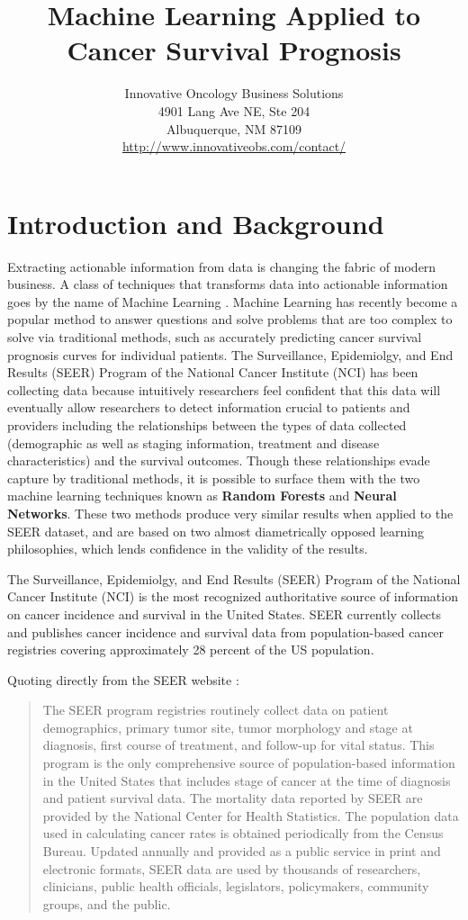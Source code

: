 \documentclass[a4paper,11pt]{article}
\title{Machine Learning Applied to Cancer Survival Prognosis}
\author{Innovative Oncology Business Solutions \\
 4901 Lang Ave NE, Ste 204 \\
Albuquerque, NM 87109 \\
\url{http://www.innovativeobs.com/contact/}}
\date{}
\begin{document}
\maketitle
\flushbottom


\section{Introduction and Background}
\label{sec:intro}



Extracting actionable information from data is changing the fabric of modern business. A class of techniques that transforms data into actionable information goes by the name of Machine Learning \cite{pythonmachinelearning}.
Machine Learning has recently become a popular method to answer questions and solve problems that are too complex to solve via traditional methods, such as  accurately predicting cancer survival prognosis curves for individual patients.
The Surveillance, Epidemiolgy, and End Results (SEER) Program of the National Cancer Institute (NCI) has been collecting data because intuitively researchers feel confident that this data will 
eventually allow researchers to detect information crucial to patients and providers including the 
relationships between the types of data collected (demographic as well as staging information, treatment and disease characteristics) and the survival outcomes.
Though these relationships evade capture by traditional methods, it is possible to surface them with the two machine learning techniques known as \textbf{Random Forests} and \textbf{Neural Networks}. These two methods produce very similar results when applied to the SEER dataset, and are based on two almost diametrically opposed learning philosophies, which lends confidence in the validity of the results.

The Surveillance, Epidemiolgy, and End Results (SEER) Program of the National Cancer Institute (NCI) is the most recognized authoritative source of information on cancer incidence and survival in the United States. SEER currently collects and publishes cancer incidence and survival data from population-based cancer registries covering approximately 28 percent of the US population.


Quoting directly from the SEER
website \citep{seerwebsite}:

\begin{quote}
The SEER program registries routinely collect data on patient demographics, primary tumor site, tumor morphology and stage at diagnosis, first course of treatment, and follow-up for vital status. This program is the only comprehensive source of population-based information in the United States that includes stage of cancer at the time of diagnosis and patient survival data. The mortality data reported by SEER are provided by the National Center for Health Statistics. The population data used in calculating cancer rates is obtained periodically from the Census Bureau. Updated annually and provided as a public service in print and electronic formats, SEER data are used by thousands of researchers, clinicians, public health officials, legislators, policymakers, community groups, and the public.
\end{quote}
\end{document}
